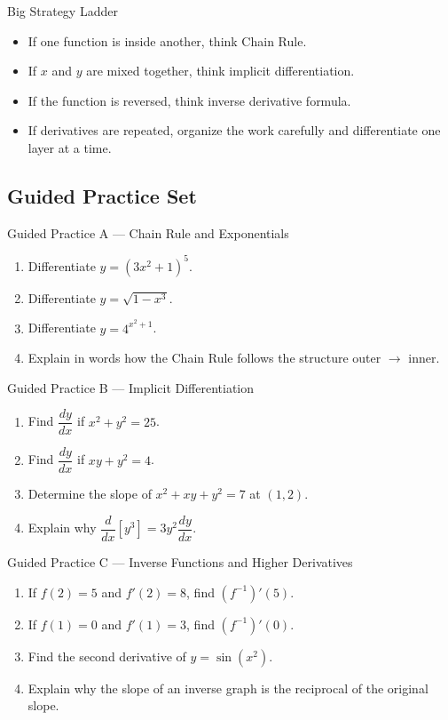 \documentclass[11pt]{article}
\begin{document}
\begin{summarybox}{Big Strategy Ladder}
\begin{itemize}
    \item If one function is inside another, think Chain Rule.
    \item If $x$ and $y$ are mixed together, think implicit differentiation.
    \item If the function is reversed, think inverse derivative formula.
    \item If derivatives are repeated, organize the work carefully and differentiate one layer at a time.
\end{itemize}
\end{summarybox}

\newpage
\subsection{Guided Practice Set}

\begin{practicebox}{Guided Practice A --- Chain Rule and Exponentials}
\begin{enumerate}
    \item Differentiate $y=(3x^2+1)^5$.
    \item Differentiate $y=\sqrt{1-x^3}$.
    \item Differentiate $y=4^{x^2+1}$.
    \item Explain in words how the Chain Rule follows the structure outer $\rightarrow$ inner.
\end{enumerate}
\end{practicebox}

\begin{practicebox}{Guided Practice B --- Implicit Differentiation}
\begin{enumerate}
    \item Find $\dfrac{dy}{dx}$ if $x^2+y^2=25$.
    \item Find $\dfrac{dy}{dx}$ if $xy+y^2=4$.
    \item Determine the slope of $x^2+xy+y^2=7$ at $(1,2)$.
    \item Explain why $\dfrac{d}{dx}[y^3]=3y^2\dfrac{dy}{dx}$.
\end{enumerate}
\end{practicebox}

\begin{practicebox}{Guided Practice C --- Inverse Functions and Higher Derivatives}
\begin{enumerate}
    \item If $f(2)=5$ and $f'(2)=8$, find $(f^{-1})'(5)$.
    \item If $f(1)=0$ and $f'(1)=3$, find $(f^{-1})'(0)$.
    \item Find the second derivative of $y=\sin(x^2)$.
    \item Explain why the slope of an inverse graph is the reciprocal of the original slope.
\end{enumerate}
\end{practicebox}
\end{document}
